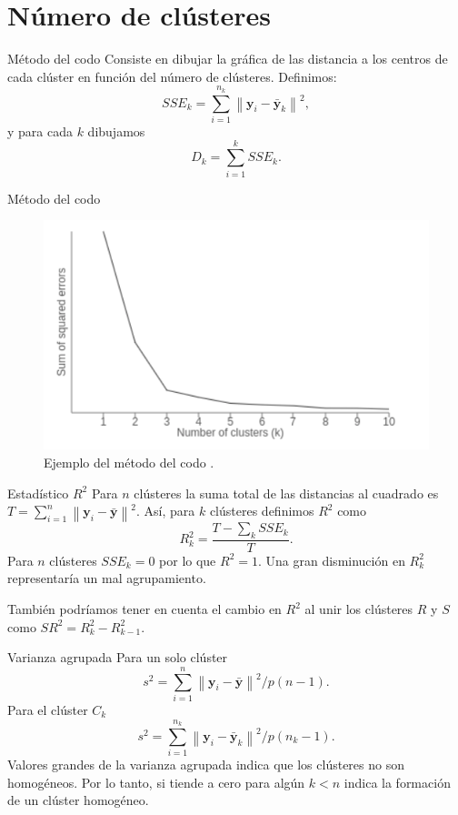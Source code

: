 \documentclass[spanish]{beamer}
\newcommand{\norm}[1]{\left\lVert#1\right\rVert}
\newcommand{\yy}{\textbf{y}}
\begin{document}
\section{Número de clústeres}

\begin{frame}{Método del codo}
	Consiste en dibujar la gráfica de las distancia a los centros de cada clúster en función del número de clústeres. Definimos:
	\[
	SSE_k = \sum_{i = 1}^{n_k} \norm{\yy_i - \bar{\yy}_k}^2,
	\]
	y para cada $ k $ dibujamos
	\[
	D_k = \sum_{i = 1} ^ {k} SSE_k.
	\]
\end{frame}

\begin{frame}{Método del codo}
	\begin{figure}[h]
		\centering
		\includegraphics[scale=0.5]{pedro/elbowGraph}
		\caption{Ejemplo del método del codo \cite{elbowGraph}.}
		\label{smkm}
	\end{figure}
\end{frame}

\begin{frame}{Estadístico $ R^2 $}
	Para $ n $ clústeres la suma total de las distancias al cuadrado es $ T = \sum_{i = 1}^{n} \norm{\yy_i - \bar{\yy}}^2 $. Así, para $ k $ clústeres definimos $ R^2 $ como
	\[
	R^{2}_{k} = \frac{T - \sum_k SSE_k}{T}.
	\]
	Para $ n $ clústeres $ SSE_k = 0 $ por lo que $ R^2 = 1 $. Una gran disminución en $ R^2_k $ representaría un mal agrupamiento. \break
       
También podríamos tener en cuenta el cambio en $ R^2 $ al unir los clústeres $ R $ y $ S $ como $ SR^2 = R_k^2 - R^2_{k-1} $.
\end{frame}

\begin{frame}{Varianza agrupada}
	Para un solo clúster \[ s^2 = \sum_{i=1}^{n} \norm{\yy_i - \bar{\yy}}^2/ p(n-1).\]
	Para el clúster $ C_k $
	\[
	s^2 = \sum_{i=1}^{n_k} \norm{\yy_i - \bar{\yy}_k}^2/ p(n_k-1).
	\]
	Valores grandes de la varianza agrupada indica que los clústeres no son homogéneos. Por lo tanto, si tiende a cero para algún $  k < n $ indica la formación de un clúster homogéneo.
\end{frame}
\end{document}
